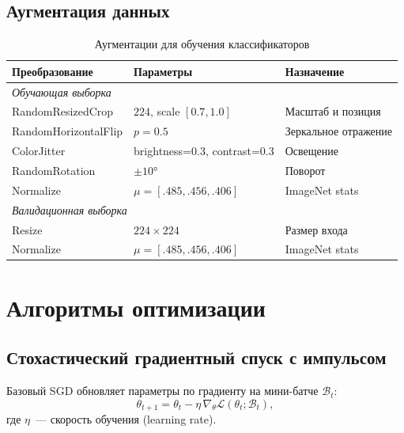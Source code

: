 \documentclass[10pt,a4paper]{report}
\numberwithin{equation}{chapter}
\numberwithin{figure}{chapter}
\numberwithin{table}{chapter}
\begin{document}
\subsection{Аугментация данных}

\begin{table}[H]
\centering
\caption{Аугментации для обучения классификаторов}
\label{tab:augmentation}
\begin{tabularx}{\textwidth}{lXX}
\toprule
\textbf{Преобразование} & \textbf{Параметры} & \textbf{Назначение} \\
\midrule
\multicolumn{3}{l}{\textit{Обучающая выборка}} \\
RandomResizedCrop   & $224$, scale $[0.7, 1.0]$     & Масштаб и позиция \\
RandomHorizontalFlip & $p=0.5$                      & Зеркальное отражение \\
ColorJitter         & brightness=0.3, contrast=0.3  & Освещение \\
RandomRotation      & $\pm 10°$                     & Поворот \\
Normalize           & $\mu=[.485,.456,.406]$         & ImageNet stats \\
\midrule
\multicolumn{3}{l}{\textit{Валидационная выборка}} \\
Resize              & $224\times224$                 & Размер входа \\
Normalize           & $\mu=[.485,.456,.406]$         & ImageNet stats \\
\bottomrule
\end{tabularx}
\end{table}

\section{Алгоритмы оптимизации}

\subsection{Стохастический градиентный спуск с импульсом}

Базовый SGD обновляет параметры по градиенту на мини-батче
$\mathcal{B}_t$:
\begin{equation}
  \theta_{t+1} = \theta_t -
    \eta\,\nabla_\theta\mathcal{L}(\theta_t;\mathcal{B}_t),
\end{equation}
где $\eta$~--- скорость обучения (learning rate).
\end{document}
